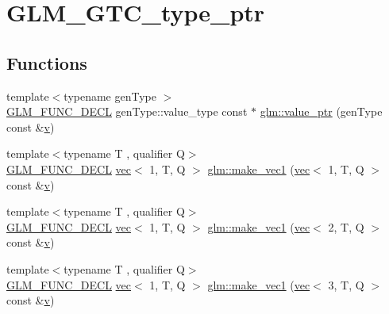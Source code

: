 \hypertarget{group__gtc__type__ptr}{}\section{G\+L\+M\+\_\+\+G\+T\+C\+\_\+type\+\_\+ptr}
\label{group__gtc__type__ptr}
\subsection*{Functions}
\begin{DoxyCompactItemize}
\item 
{\footnotesize template$<$typename gen\+Type $>$ }\\\hyperlink{setup_8hpp_ab2d052de21a70539923e9bcbf6e83a51}{G\+L\+M\+\_\+\+F\+U\+N\+C\+\_\+\+D\+E\+CL} gen\+Type\+::value\+\_\+type const  $\ast$ \hyperlink{group__gtc__type__ptr_ga1c64669e1ba1160ad9386e43dc57569a}{glm\+::value\+\_\+ptr} (gen\+Type const \&\hyperlink{_s_d_l__opengl_8h_a10a82eabcb59d2fcd74acee063775f90}{v})
\item 
{\footnotesize template$<$typename T , qualifier Q$>$ }\\\hyperlink{setup_8hpp_ab2d052de21a70539923e9bcbf6e83a51}{G\+L\+M\+\_\+\+F\+U\+N\+C\+\_\+\+D\+E\+CL} \hyperlink{structglm_1_1vec}{vec}$<$ 1, T, Q $>$ \hyperlink{group__gtc__type__ptr_ga4135f03f3049f0a4eb76545c4967957c}{glm\+::make\+\_\+vec1} (\hyperlink{structglm_1_1vec}{vec}$<$ 1, T, Q $>$ const \&\hyperlink{_s_d_l__opengl_8h_a10a82eabcb59d2fcd74acee063775f90}{v})
\item 
{\footnotesize template$<$typename T , qualifier Q$>$ }\\\hyperlink{setup_8hpp_ab2d052de21a70539923e9bcbf6e83a51}{G\+L\+M\+\_\+\+F\+U\+N\+C\+\_\+\+D\+E\+CL} \hyperlink{structglm_1_1vec}{vec}$<$ 1, T, Q $>$ \hyperlink{group__gtc__type__ptr_ga13c92b81e55f201b052a6404d57da220}{glm\+::make\+\_\+vec1} (\hyperlink{structglm_1_1vec}{vec}$<$ 2, T, Q $>$ const \&\hyperlink{_s_d_l__opengl_8h_a10a82eabcb59d2fcd74acee063775f90}{v})
\item 
{\footnotesize template$<$typename T , qualifier Q$>$ }\\\hyperlink{setup_8hpp_ab2d052de21a70539923e9bcbf6e83a51}{G\+L\+M\+\_\+\+F\+U\+N\+C\+\_\+\+D\+E\+CL} \hyperlink{structglm_1_1vec}{vec}$<$ 1, T, Q $>$ \hyperlink{group__gtc__type__ptr_ga3c23cc74086d361e22bbd5e91a334e03}{glm\+::make\+\_\+vec1} (\hyperlink{structglm_1_1vec}{vec}$<$ 3, T, Q $>$ const \&\hyperlink{_s_d_l__opengl_8h_a10a82eabcb59d2fcd74acee063775f90}{v})

\end{DoxyCompactItemize}
